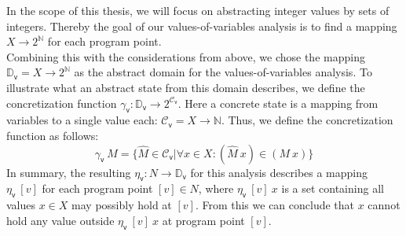     In the scope of this thesis, we will focus on abstracting integer values by sets of integers. Thereby the goal of our values-of-variables analysis is to find a mapping $X \rightarrow 2^\mathbb{N}$ for each program point.\\
    Combining this with the considerations from above, we chose the mapping $\mathbb{D}_\textsf{v} = X \rightarrow 2^\mathbb{N}$ as the abstract domain for the values-of-variables analysis. To illustrate what an abstract state from this domain describes, we define the concretization function $\gamma_\textsf{v}: \mathbb{D}_\textsf{v} \rightarrow 2^{\mathcal{C}_\textsf{v}}$. Here a concrete state is a mapping from variables to a single value each: $\mathcal{C}_\textsf{v} = X \rightarrow \mathbb{N}$. Thus, we define the concretization function as follows:
    \[ \gamma_\textsf{v}\ M = \{ \widehat{M} \in \mathcal{C}_\textsf{v} | \forall x \in X: (\widehat{M}\ x) \in (M\ x) \} \]
    In summary, the resulting $\eta_\textsf{v}: N \rightarrow \mathbb{D}_\textsf{v}$ for this analysis describes a mapping $\eta_\textsf{v}\ [v]$ for each program point $[v] \in N$, where $\eta_\textsf{v}\ [v]\ x$ is a set containing all values $x \in X$ may possibly hold at $[v]$. From this we can conclude that $x$ cannot hold any value outside $\eta_\textsf{v}\ [v]\ x$ at program point $[v]$. 


